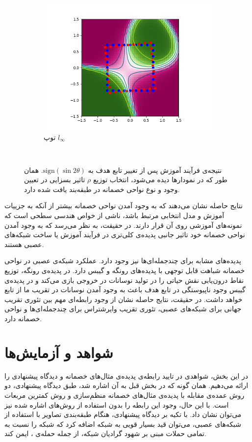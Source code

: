 \documentclass[12pt,onecolumn,a4paper]{article}
\begin{document}
\begin{figure}
	\begin{subfigure}[b]{0.3\textwidth}
		\includegraphics[width=\textwidth]{2d_even_linf.png}
		\caption{توپ $l_\infty$}
		\label{fig:evenballinf}
	\end{subfigure}
	~ %
	\caption{
		نتیجه‌ی فرآیند آموزش پس از تغییر تابع هدف به $\mathrm{sign}(\sin2\theta)$. همان طور که در نمودارها دیده می‌شود، انتخاب توزیع $\rho$ تاثیر بسزایی در تعیین وجود و نوع نواحی خصمانه در طبقه‌بند یافت شده دارد.
	}
	\label{fig:evenballs}
\end{figure}

نتایج حاصله نشان می‌دهند که به وجود آمدن نواحی خصمانه بیشتر از آنکه به جزییات آموزش و مدل انتخابی مرتبط باشد، ناشی از خواص هندسی سطحی است که نمونه‌های آموزشی روی آن قرار دارند. در حقیقت، به نظر می‌رسد که به وجود آمدن نواحی خصمانه خود تاثیر جانبی پدیده‌ی کلی‌تری در فرآیند آموزش یا ساخت شبکه‌های عصبی هستند.

پدیده‌های مشابه برای چندجمله‌ای‌ها نیز وجود دارد. عملکرد شبکه‌ی عصبی در نواحی خصمانه شباهت قابل توجهی با پدیده‌های رونگه و گیبس دارد. در پدیده‌ی رونگه، توزیع نقاط درون‌یابی نقش حیاتی را در تولید نوسانات در خروجی بازی می‌کند و در پدیده‌ی گیبس وجود ناپیوستگی در تابع هدف باعث به وجود آمدن نوسانات در تقریب ما از تابع خواهد داشت. در حقیقت، نتایج حاصله نشان از وجود رابطه‌‌ای مهم بین تئوری تقریب جهانی برای شبکه‌های عصبی، تئوری تقریب وایرشتراس برای چندجمله‌ای‌ها و نواحی خصمانه دارد.

\section{شواهد و آزمایش‌ها}
در این بخش، شواهدی در تایید رابطه‌ی پدیده‌ی مثال‌های خصمانه و دیدگاه پیشنهادی را ارائه می‌دهیم. همان گونه که در بخش قبل به آن اشاره شد، طبق دیدگاه پیشنهادی، دو روش عمده‌ی مقابله با پدیده‌ی مثال‌های خصمانه منظم‌سازی و روش کمترین مربعات است. با این  حال، وجود این رابطه را بدون استفاده از روش‌های اشاره شده نیز می‌توان نشان داد. با تکیه بر دیدگاه پیشنهادی، هنگام طبقه‌بندی تصاویر با استفاده از شبکه‌های عصبی، می‌توان قید بسیار قویی به شبکه اضافه کرد که شبکه را نسبت به تمامی حملات مبنی بر شهود گرادیان  شبکه، از جمله حمله‌ی ، ایمن کند.
\end{document}
